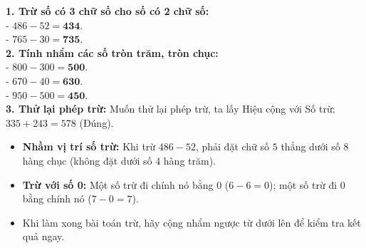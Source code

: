\documentclass[10pt,a4paper]{article}
\begin{document}
\vspace{-1.5mm}
\noindent
\begin{minipage}[t]{0.49\textwidth}\vspace{0pt}
\begin{tcolorbox}[
  enhanced,
  colback=green!4!white,
  colframe=green!60!black,
  arc=2mm, boxrule=0.8pt,
  left=2mm, right=2mm, top=1.8mm, bottom=1.8mm,
  title={\footnotesize\bfseries\color{white}\faCheckCircle\ 4. Các dạng bài tập điển hình}
]
{\footnotesize
\textbf{1. Trừ số có 3 chữ số cho số có 2 chữ số:}\\
- $486 - 52 = \mathbf{434}$.\\
- $765 - 30 = \mathbf{735}$.\\
\textbf{2. Tính nhẩm các số tròn trăm, tròn chục:}\\
- $800 - 300 = \mathbf{500}$.\\
- $670 - 40 = \mathbf{630}$.\\
- $950 - 500 = \mathbf{450}$.\\
\textbf{3. Thử lại phép trừ:} Muốn thử lại phép trừ, ta lấy Hiệu cộng với Số trừ: $335 + 243 = 578$ (Đúng).
}
\end{tcolorbox}
\end{minipage}
\hfill
\begin{minipage}[t]{0.49\textwidth}\vspace{0pt}
\begin{tcolorbox}[
  enhanced,
  colback=rose!4!white,
  colframe=rose!70!black,
  arc=2mm, boxrule=0.8pt,
  left=2mm, right=2mm, top=1.8mm, bottom=1.8mm,
  title={\footnotesize\bfseries\color{white}\faExclamationTriangle\ 5. Cạm bẫy \& Cách thử lại}
]
{\footnotesize
\begin{itemize}\setlength{\itemsep}{1.5pt}\setlength{\leftskip}{-2.5mm}
  \item \textbf{Nhầm vị trí số trừ:} Khi trừ $486 - 52$, phải đặt chữ số $5$ thẳng dưới số $8$ hàng chục (không đặt dưới số $4$ hàng trăm).
  \item \textbf{Trừ với số 0:} Một số trừ đi chính nó bằng $0$ ($6 - 6 = 0$); một số trừ đi $0$ bằng chính nó ($7 - 0 = 7$).
  \item Khi làm xong bài toán trừ, hãy cộng nhẩm ngược từ dưới lên để kiểm tra kết quả ngay.
\end{itemize}
}
\end{tcolorbox}
\end{minipage}
\end{document}
